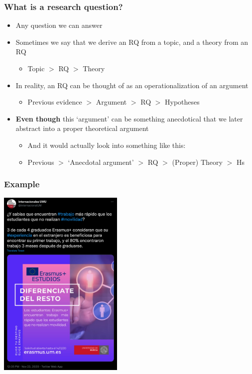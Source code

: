 \documentclass[aspectratio=43]{beamer}
\begin{document}
\begin{frame}
\frametitle{What is a research question?}
\centering

\begin{itemize}
  \item<1-> Any question we can answer
  \item<1-> Sometimes we say that we derive an RQ from a topic, and a theory from an RQ
  \begin{itemize}
    \item Topic $>$ RQ $>$ Theory
  \end{itemize}
  \item<2-> In reality, an RQ can be thought of as an operationalization of an argument
  \begin{itemize}
    \item Previous evidence $>$ Argument $>$ RQ $>$ Hypotheses
  \end{itemize}
  \item<2-> \textbf{Even though} this `argument' can be something anecdotical that we later abstract into a proper theoretical argument
  \begin{itemize}
    \item<3-> And it would actually look into something like this:
    \item<3-> Previous $>$ `Anecdotal argument' $>$ RQ $>$ (Proper) Theory $>$ Hs
  \end{itemize}
\end{itemize}

\end{frame}

\begin{frame}
\frametitle{Example}
\centering

\includegraphics[width = 0.45\textwidth]{img/umu_erasmus}

\end{frame}
\end{document}
